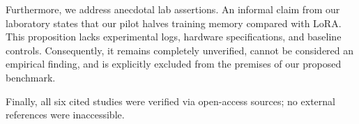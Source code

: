\documentclass[11pt,a4paper]{article}
\begin{document}
Furthermore, we address anecdotal lab assertions. An informal claim from our laboratory states that our pilot halves training memory compared with LoRA. This proposition lacks experimental logs, hardware specifications, and baseline controls. Consequently, it remains completely unverified, cannot be considered an empirical finding, and is explicitly excluded from the premises of our proposed benchmark.

Finally, all six cited studies were verified via open-access sources; no external references were inaccessible.



\end{document}
